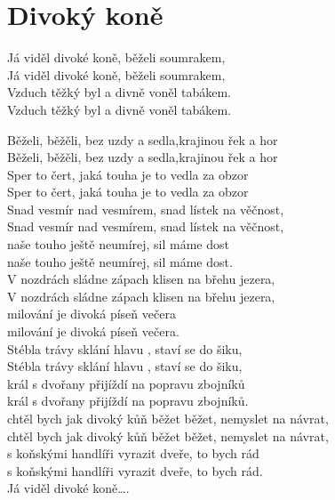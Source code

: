 \section{Divoký koně}
\onehalfspacing

Já viděl divoké koně, běželi soumrakem, \\
Já viděl divoké koně, běželi soumrakem,\\
Vzduch těžký byl a divně voněl tabákem.\\
Vzduch těžký byl a divně voněl tabákem.\\
\begin{multicols}{2}
\singlespacing

\sloka
Běželi, běžěli, bez uzdy a sedla,krajinou řek a hor\\
Běželi, běžěli, bez uzdy a sedla,krajinou řek a hor\\
Sper to čert, jaká touha je to vedla za obzor\\
Sper to čert, jaká touha je to vedla za obzor\\

\sloka
Snad vesmír nad vesmírem, snad lístek na věčnost,\\
Snad vesmír nad vesmírem, snad lístek na věčnost,\\
naše touho ještě neumírej, sil máme dost\\
naše touho ještě neumírej, sil máme dost.\\

\sloka
V nozdrách sládne zápach klisen na břehu jezera,\\
V nozdrách sládne zápach klisen na břehu jezera,\\
milování je divoká píseň večera\\
milování je divoká píseň večera.\\

\sloka
Stébla trávy sklání hlavu , staví se do šiku,\\
Stébla trávy sklání hlavu , staví se do šiku,\\
král s dvořany přijíždí na popravu zbojníků\\
král s dvořany přijíždí na popravu zbojníků.\\

\sloka
chtěl bych jak divoký kůň běžet běžet, nemyslet na návrat,\\
chtěl bych jak divoký kůň běžet běžet, nemyslet na návrat,\\
s koňskými handlíři vyrazit dveře, to bych rád\\
s koňskými handlíři vyrazit dveře, to bych rád.\\

\sloka
Já viděl divoké koně….\\

\end{multicols}